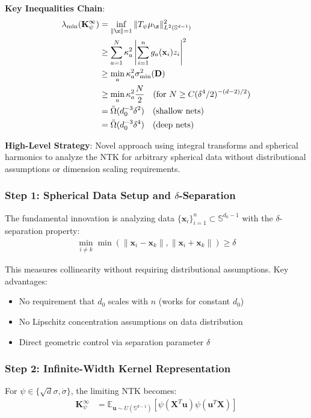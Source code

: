 \documentclass{article}
\newcommand{\x}{\mathbf{x}}
\begin{document}
\textbf{Key Inequalities Chain}:
\begin{align}
    \lambda_{\min}(\mathbf{K}_{\psi}^{\infty}) &= \inf_{\|\z\|=1} \|T_{\psi}\mu_{\z}\|_{L^2(\mathbb{S}^{d-1})}^2 \\
    &\geq \sum_{a=1}^N \kappa_a^2 \left|\sum_{i=1}^n g_a(\x_i) z_i\right|^2 \\
    &\geq \min_a \kappa_a^2 \sigma_{\min}^2(\mathbf{D}) \\
    &\geq \min_a \kappa_a^2 \frac{N}{2} \quad \text{(for } N \geq C(\delta^4/2)^{-(d-2)/2}\text{)} \\
    &= \tilde{\Omega}(d_0^{-3}\delta^2) \quad \text{(shallow nets)} \\
    &= \tilde{\Omega}(d_0^{-3}\delta^4) \quad \text{(deep nets)}
\end{align}

\textbf{High-Level Strategy}: Novel approach using integral transforms and spherical harmonics to analyze the NTK for arbitrary spherical data without distributional assumptions or dimension scaling requirements.

\subsubsection{Step 1: Spherical Data Setup and $\delta$-Separation}

The fundamental innovation is analyzing data $\{\x_i\}_{i=1}^n \subset \mathbb{S}^{d_0-1}$ with the $\delta$-separation property:
\begin{align}
    \min_{i \neq k} \min(\|\x_i - \x_k\|, \|\x_i + \x_k\|) \geq \delta
\end{align}

This measures collinearity without requiring distributional assumptions. Key advantages:
\begin{itemize}
    \item No requirement that $d_0$ scales with $n$ (works for constant $d_0$)
    \item No Lipschitz concentration assumptions on data distribution
    \item Direct geometric control via separation parameter $\delta$
\end{itemize}

\subsubsection{Step 2: Infinite-Width Kernel Representation}

For $\psi \in \{\sqrt{d}\sigma, \dot{\sigma}\}$, the limiting NTK becomes:
\begin{align*}
    \mathbf{K}^{\infty}_{\psi} &= \mathbb{E}_{\mathbf{u} \sim U(\mathbb{S}^{d-1})}[\psi(\mathbf{X}^T\mathbf{u})\psi(\mathbf{u}^T\mathbf{X})]
\end{align*}
\end{document}
